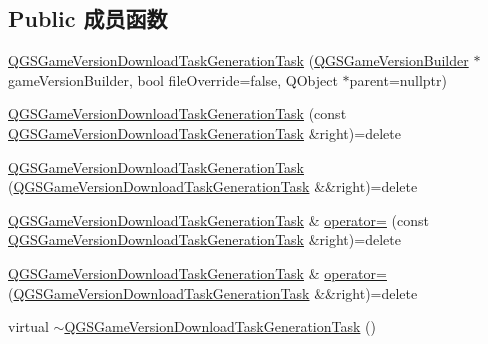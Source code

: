 \subsection*{Public 成员函数}
\begin{DoxyCompactItemize}
\item 
\mbox{\hyperlink{class_q_g_s_game_version_download_task_generation_task_a1322ecb0832336398b63d9f938f6aeca}{Q\+G\+S\+Game\+Version\+Download\+Task\+Generation\+Task}} (\mbox{\hyperlink{class_q_g_s_game_version_builder}{Q\+G\+S\+Game\+Version\+Builder}} $\ast$game\+Version\+Builder, bool file\+Override=false, Q\+Object $\ast$parent=nullptr)
\item 
\mbox{\hyperlink{class_q_g_s_game_version_download_task_generation_task_a178b0df581c9ad149eef2a8c33fda858}{Q\+G\+S\+Game\+Version\+Download\+Task\+Generation\+Task}} (const \mbox{\hyperlink{class_q_g_s_game_version_download_task_generation_task}{Q\+G\+S\+Game\+Version\+Download\+Task\+Generation\+Task}} \&right)=delete
\item 
\mbox{\hyperlink{class_q_g_s_game_version_download_task_generation_task_a97baedb264b6cb09cfe3bbf82b2603f3}{Q\+G\+S\+Game\+Version\+Download\+Task\+Generation\+Task}} (\mbox{\hyperlink{class_q_g_s_game_version_download_task_generation_task}{Q\+G\+S\+Game\+Version\+Download\+Task\+Generation\+Task}} \&\&right)=delete
\item 
\mbox{\hyperlink{class_q_g_s_game_version_download_task_generation_task}{Q\+G\+S\+Game\+Version\+Download\+Task\+Generation\+Task}} \& \mbox{\hyperlink{class_q_g_s_game_version_download_task_generation_task_a0430a5c6151b8147a0261ab8a883089f}{operator=}} (const \mbox{\hyperlink{class_q_g_s_game_version_download_task_generation_task}{Q\+G\+S\+Game\+Version\+Download\+Task\+Generation\+Task}} \&right)=delete
\item 
\mbox{\hyperlink{class_q_g_s_game_version_download_task_generation_task}{Q\+G\+S\+Game\+Version\+Download\+Task\+Generation\+Task}} \& \mbox{\hyperlink{class_q_g_s_game_version_download_task_generation_task_ac4e7f680720ee3e14f30bf64afe9af91}{operator=}} (\mbox{\hyperlink{class_q_g_s_game_version_download_task_generation_task}{Q\+G\+S\+Game\+Version\+Download\+Task\+Generation\+Task}} \&\&right)=delete
\item 
virtual \mbox{\hyperlink{class_q_g_s_game_version_download_task_generation_task_a67318eeebcf6f8530107d96cf2ca656c}{$\sim$\+Q\+G\+S\+Game\+Version\+Download\+Task\+Generation\+Task}} ()
\end{DoxyCompactItemize}

